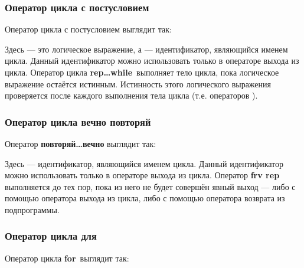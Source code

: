 \documentclass[10pt]{report}
\begin{document}
        \subsubsection{Оператор цикла с постусловием}
Оператор цикла с постусловием выглядит так:
\begin{center}
\textcolor{Green}{}
\end{center}
Здесь \textcolor{Green}{} --- это логическое выражение, а  \textcolor{Green}{} --- идентификатор, являющийся именем цикла.
Данный идентификатор можно использовать только в операторе выхода из цикла. Оператор цикла \textbf{\glqq rep\dots while\grqq}\ выполняет тело цикла, пока логическое
выражение \textcolor{Green}{} остаётся истинным. Истинность этого логического выражения проверяется после каждого выполнения тела цикла (т.е.
операторов \textcolor{Green}{}).
        \subsubsection{Оператор цикла \glqq вечно повторяй\grqq}
Оператор \textbf{\glqq повторяй\dots вечно\grqq} выглядит так:
\begin{center}
\textcolor{Green}{}
\end{center}
Здесь \textcolor{Green}{} --- идентификатор, являющийся именем цикла. Данный идентификатор можно использовать только в операторе выхода из цикла.
Оператор \textbf{\glqq frv rep\grqq} выполняется до тех пор, пока из него не будет совершён явный выход --- либо с помощью оператора выхода из цикла, либо с
помощью оператора возврата из подпрограммы.
    

        \subsubsection{Оператор цикла \glqq для\grqq}
Оператор цикла \textbf{\glqq for\grqq}\ выглядит так:
\begin{center}
\textcolor{Green}{}
\end{center}
\end{document}

